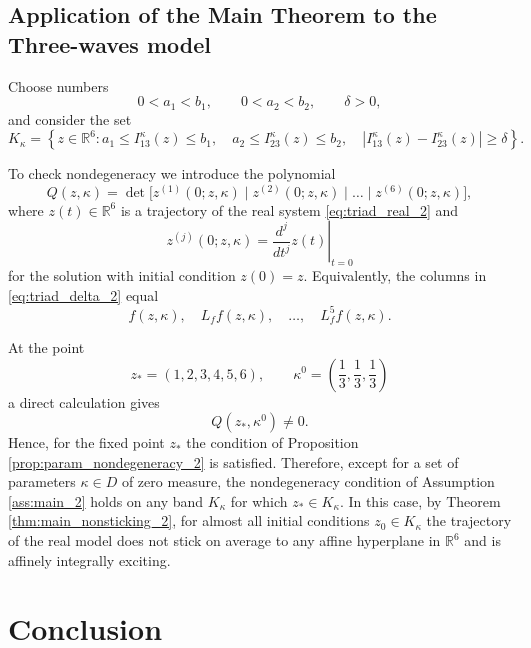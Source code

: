 \documentclass[11pt]{article}
\newcommand{\R}{\mathbb{R}}
\theoremstyle{thmstyleone}
\theoremstyle{thmstyletwo}
\theoremstyle{thmstylethree}
\begin{document}
\subsection{Application of the Main Theorem to the Three-waves model}
\label{sec:triad_application_2}

Choose numbers
\[
    0<a_1<b_1,
    \qquad
    0<a_2<b_2,
    \qquad
    \delta>0,
\]
and consider the set
\begin{equation}\label{eq:triad_band_2}
    K_{\kappa}=\left\{z\in\R^6:
    a_1\le I_{13}^{\kappa}(z)\le b_1,
    \quad
    a_2\le I_{23}^{\kappa}(z)\le b_2,
    \quad
    |I_{13}^{\kappa}(z)-I_{23}^{\kappa}(z)|\ge\delta
    \right\}.
\end{equation}

To check nondegeneracy we introduce the polynomial
\begin{equation}\label{eq:triad_delta_2}
    Q(z,\kappa)=
    \det\bigl[z^{(1)}(0;z,\kappa)\mid z^{(2)}(0;z,\kappa)
    \mid\dots\mid z^{(6)}(0;z,\kappa)\bigr],
\end{equation}
where $z(t)\in\R^6$ is a trajectory of the real system \eqref{eq:triad_real_2} and
\[
    z^{(j)}(0;z,\kappa)=\left.\frac{d^j}{dt^j}z(t)\right|_{t=0}
\]
for the solution with initial condition $z(0)=z$. Equivalently, the columns in \eqref{eq:triad_delta_2} equal
\[
    f(z,\kappa),\quad L_f f(z,\kappa),\quad \dots,\quad L_f^5 f(z,\kappa).
\]

At the point
\begin{equation}\label{eq:triad_test_point_2}
    z_*=(1,2,3,4,5,6),
    \qquad
    \kappa^0=\left(\frac{1}{3},\frac{1}{3},\frac{1}{3}\right)
\end{equation}
a direct calculation gives
\begin{equation}\label{eq:triad_delta_value_2}
    Q(z_*,\kappa^0)\ne0.
\end{equation}
Hence, for the fixed point $z_*$ the condition of Proposition \ref{prop:param_nondegeneracy_2} is satisfied. Therefore, except for a set of parameters $\kappa\in D$ of zero measure, the nondegeneracy condition of Assumption \ref{ass:main_2} holds on any band $K_\kappa$ for which $z_* \in K_\kappa$. In this case, by Theorem \ref{thm:main_nonsticking_2}, for almost all initial conditions $z_0\in K_\kappa$ the trajectory of the real model does not stick on average to any affine hyperplane in $\R^6$ and is affinely integrally exciting.




\section{Conclusion}\label{sec:discussion_2}
\end{document}
